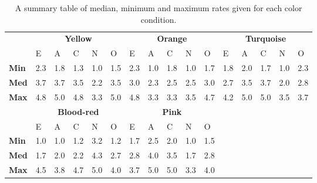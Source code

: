 \begin{table}[H]
    \renewcommand{\arraystretch}{1}
    \begin{center}
        \begin{tabular}{p{}|
        p{}|p{}|p{}|p{}|p{}||
        p{}|p{}|p{}|p{}|p{}||
        p{}|p{}|p{}|p{}|p{}|}
            \cline{2-16}
            & \multicolumn{5}{c||}{\textbf{Yellow}} & \multicolumn{5}{c||}{\textbf{Orange}}
            & \multicolumn{5}{c|}{\textbf{Turquoise}} \\
            \cline{2-16}
            & E & A & C & N & O & E & A & C & N & O & E & A & C & N & O      \\
            \cline{2-16}
            \textbf{Min}    & 2.3 & 1.8 & 1.3 & 1.0 & 1.5 & 2.3 & 1.0 & 1.8 & 1.0 & 1.7 & 1.8 & 2.0 & 1.7 & 1.0 & 2.3  \\
            \textbf{Med}    & 3.7 & 3.7 & 3.5 & 2.2 & 3.5 & 3.0 & 2.3 & 2.5 & 2.5 & 3.0 & 2.7 & 3.5 & 3.7 & 2.0 & 2.8  \\
            \textbf{Max}    & 4.8 & 5.0 & 4.8 & 3.3 & 5.0 & 4.8 & 3.3 & 3.3 & 3.5 & 4.7 & 4.2 & 5.0 & 5.0 & 3.5 & 3.7 \\
            \cline{2-16}
            \cline{2-11}
            &  \multicolumn{5}{|c||}{\textbf{Blood-red}} & \multicolumn{5}{|c||}{\textbf{Pink}} \\
            \cline{2-11}
            & E & A & C & N & O & E & A & C & N & O            \\
            \cline{2-11}
            \textbf{Min}    & 1.0 & 1.0 & 1.2 & 3.2 & 1.2 & 1.7 & 2.5 & 2.0 & 1.0 & 1.5    \\
            \textbf{Med}    & 1.7 & 2.0 & 2.2 & 4.3 & 2.7 & 2.8 & 4.0 & 3.5 & 1.7 & 2.8    \\
            \textbf{Max}    & 4.5 & 3.8 & 4.7 & 5.0 & 4.0 & 3.7 & 5.0 & 5.0 & 3.3 & 4.0    \\
            \cline{2-11}
        \end{tabular}
        \caption[]{A summary table of median, minimum and maximum rates given for each color condition.\footnotemark}
        \label{table:medianML2}
    \end{center}
\end{table}


